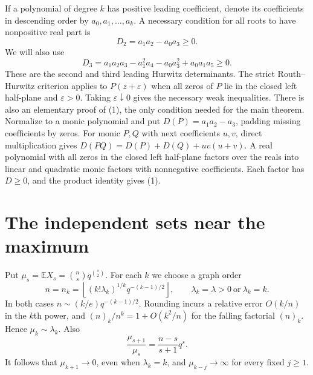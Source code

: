 \documentclass[11pt]{article}
\newcommand{\E}{\mathbb E}
\begin{document}
If a polynomial of degree $k$ has positive leading coefficient, denote
its coefficients in descending order by $a_0,a_1,\ldots,a_k$.
A necessary condition for all roots to have nonpositive real part is
\[
 D_2=a_1a_2-a_0a_3\ge0.                                      \tag{1}
\]
We will also use
\[
 D_3=a_1a_2a_3-a_1^2a_4-a_0a_3^2+a_0a_1a_5\ge0.               \tag{2}
\]
These are the second and third leading Hurwitz determinants. The
strict Routh--Hurwitz criterion applies to $P(z+\varepsilon)$ when
all zeros of $P$ lie in the closed left half-plane and $\varepsilon>0$.
Taking $\varepsilon\downarrow0$ gives the necessary weak inequalities.
There is also an elementary proof of (1), the only condition needed
for the main theorem. Normalize to a monic polynomial and put
$D(P)=a_1a_2-a_3$, padding missing coefficients by zeros.
For monic $P,Q$ with next coefficients $u,v$, direct multiplication
gives $D(PQ)=D(P)+D(Q)+uv(u+v)$. A real polynomial with all zeros
in the closed left half-plane factors over the reals into linear and
quadratic monic factors with nonnegative coefficients. Each factor has
$D\ge0$, and the product identity gives (1).

\section{The independent sets near the maximum}
Put $\mu_s=\E X_s=\binom ns q^{\binom{s}{2}}$. For each $k$ we choose
a graph order
\[
 n=n_k=\left\lfloor (k!\lambda_k)^{1/k}q^{-(k-1)/2}\right\rfloor,
 \qquad \lambda_k=\lambda>0 \ \text{or}\ \lambda_k=k .          \tag{3}
\]
In both cases $n\sim(k/e)q^{-(k-1)/2}$. Rounding incurs a relative
error $O(k/n)$ in the $k$th power, and
$(n)_k/n^k=1+O(k^2/n)$ for the falling factorial $(n)_k$. Hence
$\mu_k\sim\lambda_k$. Also
\[
 \frac{\mu_{s+1}}{\mu_s}=\frac{n-s}{s+1}q^s .                  \tag{4}
\]
It follows that $\mu_{k+1}\to0$, even when $\lambda_k=k$, and
$\mu_{k-j}\to\infty$ for every fixed $j\ge1$.
\end{document}
